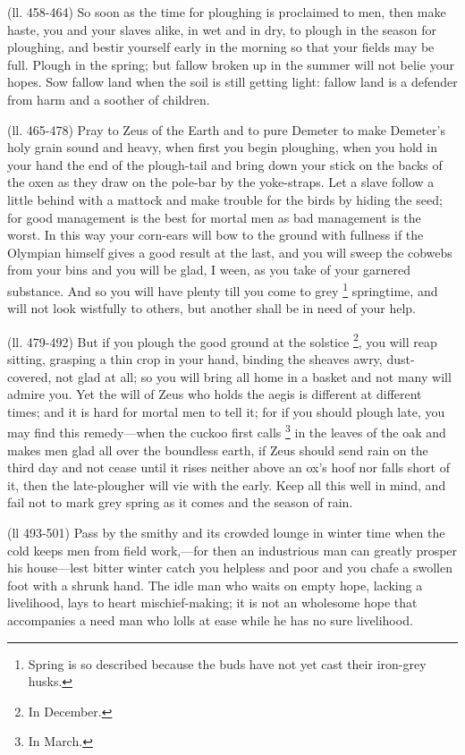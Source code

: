(ll. 458-464) So soon as the time for ploughing is proclaimed to men, then make
haste, you and your slaves alike, in wet and in dry, to plough in the season
for ploughing, and bestir yourself early in the morning so that your fields may
be full. Plough in the spring; but fallow broken up in the summer will not
belie your hopes. Sow fallow land when the soil is still getting light: fallow
land is a defender from harm and a soother of children.

(ll. 465-478) Pray to Zeus of the Earth and to pure Demeter to make
Demeter’s holy grain sound and heavy, when first you begin ploughing,
when you hold in your hand the end of the plough-tail and bring down your stick
on the backs of the oxen as they draw on the pole-bar by the yoke-straps. Let a
slave follow a little behind with a mattock and make trouble for the birds by
hiding the seed; for good management is the best for mortal men as bad
management is the worst. In this way your corn-ears will bow to the ground with
fullness if the Olympian himself gives a good result at the last, and you will
sweep the cobwebs from your bins and you will be glad, I ween, as you take of
your garnered substance. And so you will have plenty till you come to grey \footnote{Spring is so described
because the buds have not yet cast their iron-grey husks.} springtime, and will not look
wistfully to others, but another shall be in need of your help.

(ll. 479-492) But if you plough the good ground at the solstice \footnote{In December.}, you will reap sitting, grasping
a thin crop in your hand, binding the sheaves awry, dust-covered, not glad at
all; so you will bring all home in a basket and not many will admire you. Yet
the will of Zeus who holds the aegis is different at different times; and it is
hard for mortal men to tell it; for if you should plough late, you may find
this remedy—when the cuckoo first calls \footnote{In March.} in the
leaves of the oak and makes men glad all over the boundless earth, if Zeus
should send rain on the third day and not cease until it rises neither above an
ox’s hoof nor falls short of it, then the late-plougher will vie with the
early. Keep all this well in mind, and fail not to mark grey spring as it comes
and the season of rain.

(ll 493-501) Pass by the smithy and its crowded lounge in winter time when the
cold keeps men from field work,—for then an industrious man can greatly
prosper his house—lest bitter winter catch you helpless and poor and you
chafe a swollen foot with a shrunk hand. The idle man who waits on empty hope,
lacking a livelihood, lays to heart mischief-making; it is not an wholesome
hope that accompanies a need man who lolls at ease while he has no sure
livelihood.

